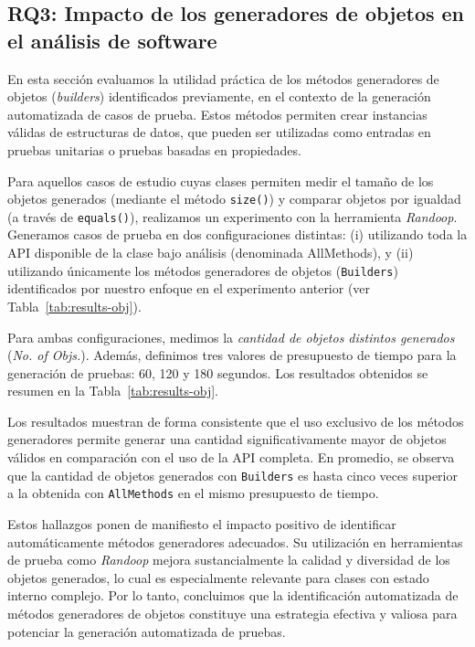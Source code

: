 \subsection{RQ3: Impacto de los generadores de objetos en el análisis de
software}

En esta sección evaluamos la utilidad práctica de los métodos generadores de objetos (\emph{builders}) 
identificados previamente, en el contexto de la generación automatizada de casos de prueba. 
Estos métodos permiten crear instancias válidas de estructuras de datos, que pueden ser utilizadas como 
entradas en pruebas unitarias o pruebas basadas en propiedades.

Para aquellos casos de estudio cuyas clases permiten medir el tamaño de los objetos generados 
(mediante el método \texttt{size()}) y comparar objetos por igualdad (a través de \texttt{equals()}), 
realizamos un experimento con la herramienta \emph{Randoop}. Generamos casos de prueba en dos 
configuraciones distintas: (i) utilizando toda la API disponible de la clase bajo análisis 
(denominada \texttt{}{AllMethods}), y (ii) utilizando únicamente los métodos generadores de objetos
(\texttt{Builders}) identificados por nuestro enfoque en el experimento anterior 
(ver Tabla~\ref{tab:results-obj}).

Para ambas configuraciones, medimos la \textit{cantidad de objetos distintos 
generados} (\textit{No. of Objs.}). Además, definimos tres valores de presupuesto de tiempo para la generación de 
pruebas: 60, 120 y 180 segundos. Los resultados obtenidos se resumen en la Tabla~\ref{tab:results-obj}.

Los resultados muestran de forma consistente que el uso exclusivo de los métodos generadores 
permite generar una cantidad significativamente mayor de objetos válidos en comparación con el uso 
de la API completa. En promedio, se observa que la cantidad de objetos generados con \texttt{Builders} 
es hasta cinco veces superior a la obtenida con \texttt{AllMethods} en el mismo presupuesto de tiempo. 

Estos hallazgos ponen de manifiesto el impacto positivo de identificar automáticamente métodos 
generadores adecuados. Su utilización en herramientas de prueba como \emph{Randoop} mejora sustancialmente 
la calidad y diversidad de los objetos generados, lo cual es especialmente relevante para clases con 
estado interno complejo. Por lo tanto, concluimos que la identificación automatizada de métodos generadores de objetos 
constituye una estrategia efectiva y valiosa para potenciar la generación automatizada de pruebas.


